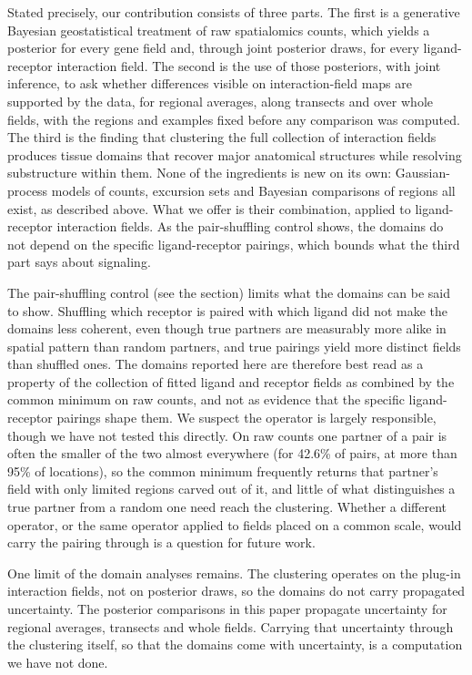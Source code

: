 \documentclass[10pt,letterpaper]{article}
\begin{document}
Stated precisely, our contribution consists of three parts. The first is a generative Bayesian geostatistical treatment of raw spatialomics counts, which yields a posterior for every gene field and, through joint posterior draws, for every ligand-receptor interaction field. The second is the use of those posteriors, with joint inference, to ask whether differences visible on interaction-field maps are supported by the data, for regional averages, along transects and over whole fields, with the regions and examples fixed before any comparison was computed. The third is the finding that clustering the full collection of interaction fields produces tissue domains that recover major anatomical structures while resolving substructure within them. None of the ingredients is new on its own: Gaussian-process models of counts, excursion sets and Bayesian comparisons of regions all exist, as described above. What we offer is their combination, applied to ligand-receptor interaction fields. As the pair-shuffling control shows, the domains do not depend on the specific ligand-receptor pairings, which bounds what the third part says about signaling.

The pair-shuffling control (see the  section) limits what the domains can be said to show. Shuffling which receptor is paired with which ligand did not make the domains less coherent, even though true partners are measurably more alike in spatial pattern than random partners, and true pairings yield more distinct fields than shuffled ones. The domains reported here are therefore best read as a property of the collection of fitted ligand and receptor fields as combined by the common minimum on raw counts, and not as evidence that the specific ligand-receptor pairings shape them. We suspect the operator is largely responsible, though we have not tested this directly. On raw counts one partner of a pair is often the smaller of the two almost everywhere (for 42.6\% of pairs, at more than 95\% of locations), so the common minimum frequently returns that partner's field with only limited regions carved out of it, and little of what distinguishes a true partner from a random one need reach the clustering. Whether a different operator, or the same operator applied to fields placed on a common scale, would carry the pairing through is a question for future work.

One limit of the domain analyses remains. The clustering operates on the plug-in interaction fields, not on posterior draws, so the domains do not carry propagated uncertainty. The posterior comparisons in this paper propagate uncertainty for regional averages, transects and whole fields. Carrying that uncertainty through the clustering itself, so that the domains come with uncertainty, is a computation we have not done.
\end{document}

